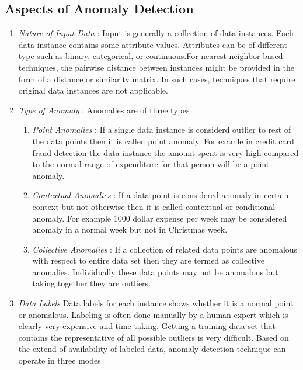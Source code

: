 \subsection{Aspects of Anomaly Detection}

\begin{enumerate}
	\item \textit{Nature of Input Data} : Input
	is generally a collection of data instances. Each data instance contains some attribute values. Attributes can be of different type such as binary, categorical, or continuous.For nearest-neighbor-based techniques, the pairwise distance between instances might be
	provided in the form of a distance or similarity matrix. In such cases, techniques that
	require original data instances are not applicable.
	
	\item \textit{Type of Anomaly} :  
	Anomalies are of three types
	\begin{enumerate}
		\item \textit{Point Anomalies} : If a single data instance is considerd outlier to rest of the data points then it is called point anomaly. For examle in credit card  fraud detection the data instance the amount spent is very high compared to the normal range of expenditure
		for that person will be a point anomaly.
		
		\item \textit{Contextual Anomalies} : If a data point is considered anomaly in certain context but not otherwise then it  is called contextual or conditional anomaly. For example 1000 dollar expense per week may be considered anomaly in a normal week but not in Christmas week.
		
		\item \textit{Collective Anomalies} : If a collection of related data points are anomalous with respect to entire data set then they are termed as collective anomalies. Individually these data points may not be anomalous but taking together they are outliers. 
	\end{enumerate}
	
	
	
	\item \textit{Data Labels}
	Data labels for each instance shows whether it is a normal point or anomalous. Labeling is often done manually by a human expert which is clearly very expensive and time taking. Getting a training data set that contains the representative of all possible outliers is very difficult. Based on the extend of availability of labeled data, anomaly detection technique can operate in three modes
	

\end{enumerate}
